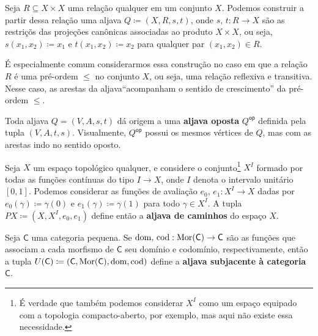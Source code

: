 \begin{exem}\label{exem:aljava_via_relacao}
    Seja $R \subseteq X \times X$ uma relação qualquer em um conjunto $X$.
    Podemos construir a partir dessa relação uma aljava $Q \coloneqq (X,R,s,t)$, onde $s,\,t: R \to X$ são as restriçõs das projeções canônicas associadas ao produto $X \times X$, ou seja, $s(x_1,x_2) \coloneqq x_1$ e $t(x_1,x_2) \coloneqq x_2$ para qualquer par $(x_1,x_2) \in R$.
    
    É especialmente comum considerarmos essa construção no caso em que a relação $R$ é uma pré-ordem $\leq$ no conjunto $X$, ou seja, uma relação reflexiva e transitiva.
    Nesse caso, as arestas da aljava``acompanham o sentido de crescimento'' da pré-ordem $\leq$.
\end{exem}

\begin{exem}\label{exem:aljava_oposta}
    Toda aljava $Q=(V,A,s,t)$ dá origem a uma \textbf{aljava oposta} $Q^{\mathsf{op}}$ definida pela tupla $(V,A,t,s)$.
    Visualmente, $Q^{\mathsf{op}}$ possui os mesmos vértices de $Q$, mas com as arestas indo no sentido oposto.
\end{exem}

\begin{exem}\label{exem:aljava_via_espaco}
    Seja $X$ um espaço topológico qualquer, e considere o conjunto\footnote{É verdade que também podemos considerar $X^I$ como um espaço equipado com a topologia compacto-aberto, por exemplo, mas aqui não existe essa necessidade.} $X^I$ formado por todas as funções contínuas do tipo $I \to X$, onde $I$ denota o intervalo unitário $[0,1]$.
    Podemos considerar as funções de avaliação $e_0,\, e_1: X^I \to X$ dadas por $e_0(\gamma) \coloneqq \gamma(0)$ e $e_1(\gamma) \coloneqq \gamma(1)$ para todo $\gamma \in X^{I}$.
    A tupla $PX \coloneqq (X,X^I,e_0,e_1)$ define então a \textbf{aljava de caminhos} do espaço $X$.
\end{exem}

\begin{exem}\label{exem:aljava_subjacente_categoria}
    Seja $\mathsf{C}$ uma categoria pequena.
    Se $\mathrm{dom},\,\mathrm{cod}: \mathrm{Mor}(\mathsf{C}) \to \mathsf{C}$ são as funções que associam a cada morfismo de $\mathsf{C}$ seu domínio e codomínio, respectivamente, então a tupla $U(\mathsf{C}) \coloneqq (\mathsf{C},\mathrm{Mor}(\mathsf{C}),\mathrm{dom},\mathrm{cod})$ define a \textbf{aljava subjacente à categoria} $\mathsf{C}$.
\end{exem}

